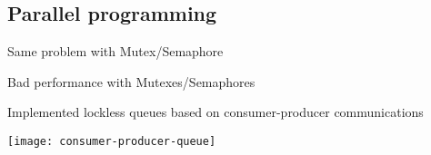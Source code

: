 \subsection{Parallel programming}
\begin{frame}{Same problem with Mutex/Semaphore}{}
	\begin{block}{Bad performance with Mutexes/Semaphores}
		\begin{ergo}
			Implemented lockless queues based on consumer-producer communications
		\end{ergo}
	\end{block}
	\begin{center} 
		\texttt{[image: consumer-producer-queue]}	
	\end{center}
\end{frame}
